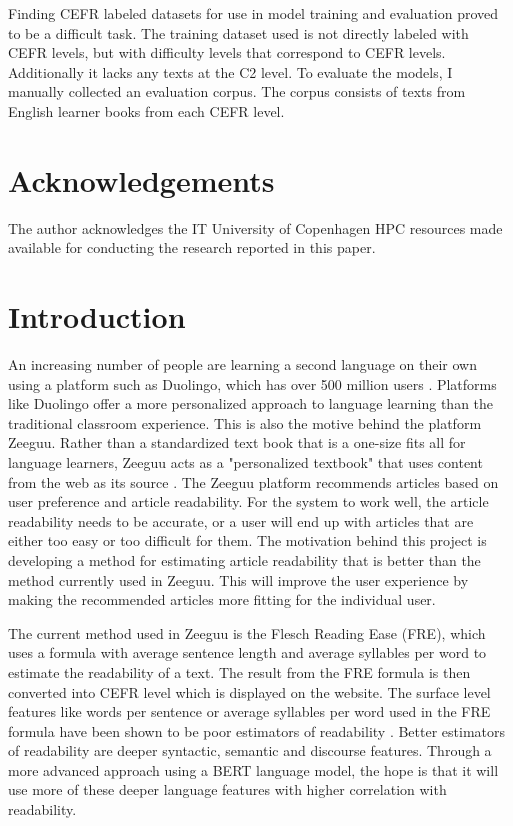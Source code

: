 \documentclass[11pt,a4paper]{article}
\begin{document}
Finding CEFR labeled datasets for use in model training and evaluation proved
to be a difficult task. The training dataset used is not directly labeled with
CEFR levels, but with difficulty levels that correspond to CEFR levels.
Additionally it lacks any texts at the C2 level. To evaluate the models, I
manually collected an evaluation corpus. The corpus consists of texts from
English learner books from each CEFR level.

\newpage

\tableofcontents

\newpage

\section{Acknowledgements}

The author acknowledges the IT University of Copenhagen HPC resources made available for conducting the research reported in this paper.

\section{Introduction}

An increasing number of people are learning a second language on their own
using a platform such as Duolingo, which has over 500 million users
\parencite{duolingo2022Duolingo}. Platforms like Duolingo offer a more
personalized approach to language learning than the traditional classroom
experience. This is also the motive behind the platform Zeeguu. Rather than a
standardized text book that is a one-size fits all for language learners,
Zeeguu acts as a "personalized textbook" that uses content from the web as its
source \parencite{10.1145/3173574.3173912}. The Zeeguu platform recommends
articles based on user preference and article readability. For the system to
work well, the article readability needs to be accurate, or a user will end up
with articles that are either too easy or too difficult for them.
The motivation behind this project is developing a method for estimating article
readability that is better than the method currently used in Zeeguu. This will
improve the user experience by making the recommended articles more fitting for
the individual user.

The current method used in Zeeguu is the Flesch Reading Ease (FRE), which uses
a formula with average sentence length and average syllables per word to
estimate the readability of a text. The result from the FRE formula is then
converted into CEFR level which is displayed on the website. The surface level features like words per
sentence or average syllables per word used in the FRE formula have been shown
to be poor estimators of readability \parencite{pitler-nenkova-2008-revisiting}.
Better estimators of readability are deeper syntactic, semantic and discourse
features. Through a more advanced approach using a BERT language model, the
hope is that it will use more of these deeper language features with higher
correlation with readability.
\end{document}
